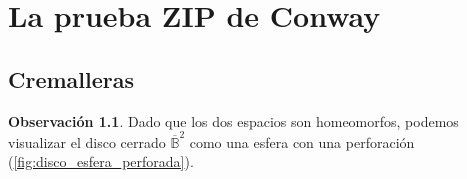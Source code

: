 \documentclass[10pt]{report}
\theoremstyle{definition}
\newtheorem{obs}[defin]{Observación}
\begin{document}

\chapter{La prueba ZIP de Conway}

\section{Cremalleras}

\begin{obs}%
Dado que los dos espacios son homeomorfos, podemos visualizar el disco cerrado $\overline{\mathbb{B}}^2$ como una esfera con una perforación (\autoref{fig:disco_esfera_perforada}).
\end{obs}
 
\end{document}

